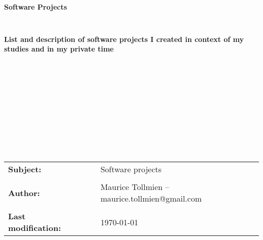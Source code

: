 \documentclass[a4paper, 12pt]{article}
\begin{document}
	
\thispagestyle{empty}



\begin{verbatim}





\end{verbatim}

\begin{center}
\textbf{\LARGE{Software Projects}}
\end{center}

\begin{verbatim}


\end{verbatim}

\begin{center}
\textbf{\large{List and description of software projects I created in context of my studies and in my private time}}
\end{center}

\begin{verbatim}












\end{verbatim}

\begin{flushleft}
\begin{tabular}{llll}

\textbf{Subject:}
& & & Software projects
\\
\\
\textbf{Author:}
& & & Maurice Tollmien -- maurice.tollmien@gmail.com
\\
\\
\textbf{Last modification:}
& & & \today



\end{tabular}
\end{flushleft}


\newpage


\tableofcontents
\newpage

\end{document}
